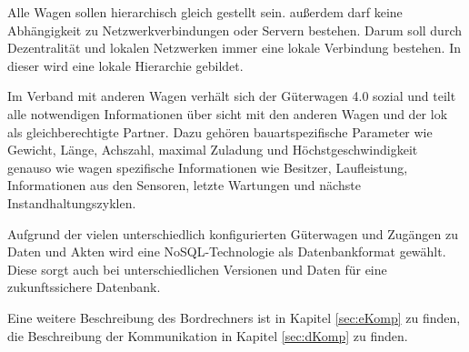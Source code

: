 Alle Wagen sollen hierarchisch gleich gestellt sein. außerdem darf keine Abhängigkeit zu Netzwerkverbindungen oder Servern bestehen. Darum soll durch Dezentralität und lokalen Netzwerken immer eine lokale Verbindung bestehen. In dieser wird eine lokale Hierarchie gebildet.\par
Im Verband mit anderen Wagen verhält sich der Güterwagen 4.0 sozial und teilt alle notwendigen Informationen über sicht mit den anderen Wagen und der lok als gleichberechtigte Partner. Dazu gehören bauartspezifische Parameter wie Gewicht, Länge, Achszahl, maximal Zuladung und Höchstgeschwindigkeit genauso wie wagen spezifische Informationen wie Besitzer, Laufleistung, Informationen aus den Sensoren, letzte Wartungen und nächste Instandhaltungszyklen.\par
Aufgrund der vielen unterschiedlich konfigurierten Güterwagen und Zugängen zu Daten und Akten wird eine NoSQL-Technologie als Datenbankformat gewählt. Diese sorgt auch bei unterschiedlichen Versionen und Daten für eine zukunftssichere Datenbank.\par
Eine weitere Beschreibung des Bordrechners ist in Kapitel \ref{sec:eKomp} zu finden, die Beschreibung der Kommunikation in Kapitel \ref{sec:dKomp} zu finden.
